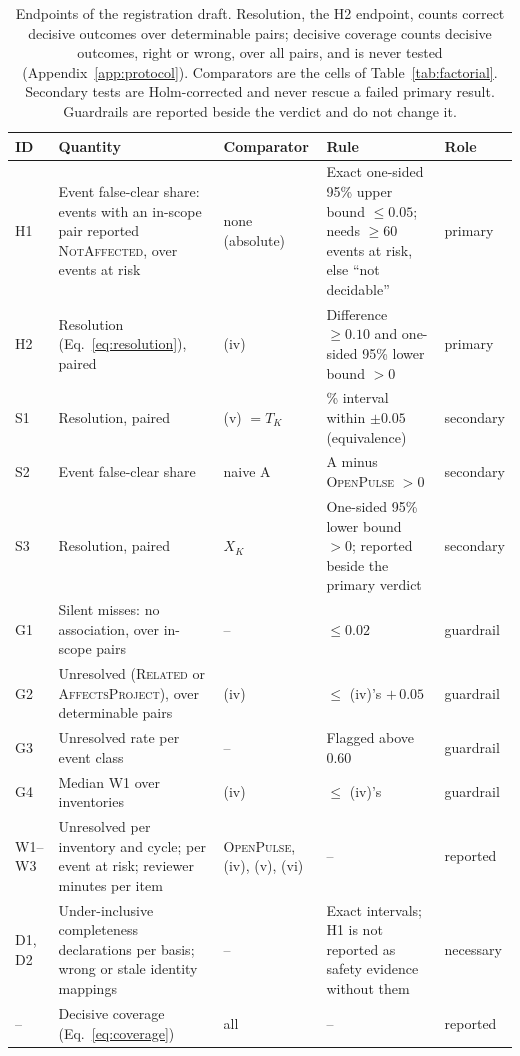 \documentclass[11pt,a4paper]{article}
\newcommand{\op}{\textsc{OpenPulse}}
\begin{document}
\begin{table}[t]
\centering
\scriptsize
\setlength{\tabcolsep}{3pt}
\begin{tabularx}{\linewidth}{@{}l >{\raggedright\arraybackslash}X >{\raggedright\arraybackslash}p{1.6cm} >{\raggedright\arraybackslash}p{3.6cm} l@{}}
\toprule
ID & Quantity & Comparator & Rule & Role \\
\midrule
H1 & Event false-clear share: events with an in-scope pair reported
  \textsc{NotAffected}, over events at risk & none (absolute) & Exact
  one-sided 95\% upper bound $\le 0.05$; needs $\ge 60$ events at risk,
  else ``not decidable'' & primary \\
H2 & Resolution (Eq.~\ref{eq:resolution}), paired & (iv) & Difference
  $\ge 0.10$ and one-sided 95\% lower bound $> 0$ & primary \\
S1 & Resolution, paired & (v) $= T_K$ & 90\% interval within
  $\pm 0.05$ (equivalence) & secondary \\
S2 & Event false-clear share & naive A & A minus \op{} $> 0$ &
  secondary \\
S3 & Resolution, paired & $X_K$ & One-sided 95\% lower bound $> 0$;
  reported beside the primary verdict & secondary \\
\midrule
G1 & Silent misses: no association, over in-scope pairs & -- &
  $\le 0.02$ & guardrail \\
G2 & Unresolved (\textsc{Related} or \textsc{AffectsProject}), over
  determinable pairs & (iv) & $\le$ (iv)'s $+\,0.05$ & guardrail \\
G3 & Unresolved rate per event class & -- & Flagged above $0.60$ &
  guardrail \\
G4 & Median W1 over inventories & (iv) & $\le$ (iv)'s & guardrail \\
\midrule
W1--W3 & Unresolved per inventory and cycle; per event at risk;
  reviewer minutes per item & \op{}, (iv), (v), (vi) & -- & reported \\
D1, D2 & Under-inclusive completeness declarations per basis; wrong or
  stale identity mappings & -- & Exact intervals; H1 is not reported as
  safety evidence without them & necessary \\
-- & Decisive coverage (Eq.~\ref{eq:coverage}) & all & -- &
  reported \\
\bottomrule
\end{tabularx}
\caption{Endpoints of the registration draft. Resolution, the H2
endpoint, counts correct decisive outcomes over determinable pairs;
decisive coverage counts decisive outcomes, right or wrong, over all
pairs, and is never tested (Appendix~\ref{app:protocol}). Comparators
are the cells of Table~\ref{tab:factorial}. Secondary tests are
Holm-corrected and never rescue a failed primary result. Guardrails are
reported beside the verdict and do not change it.}
\label{tab:endpoints}
\end{table}
\end{document}
